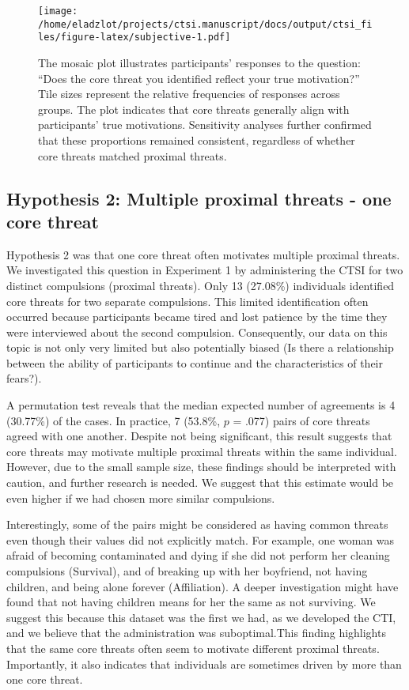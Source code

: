 \documentclass[
  man,floatsintext]{apa7}
\begin{document}
\begin{figure}
\centering
\texttt{[image: /home/eladzlot/projects/ctsi.manuscript/docs/output/ctsi\_files/figure-latex/subjective-1.pdf]}
\caption{\label{fig:subjective}The mosaic plot illustrates participants' responses to the question: ``Does the core threat you identified reflect your true motivation?'' Tile sizes represent the relative frequencies of responses across groups. The plot indicates that core threats generally align with participants' true motivations. Sensitivity analyses further confirmed that these proportions remained consistent, regardless of whether core threats matched proximal threats.}
\end{figure}

\subsection{Hypothesis 2: Multiple proximal threats - one core threat}\label{hypothesis-2-multiple-proximal-threats---one-core-threat}

Hypothesis 2 was that one core threat often motivates multiple proximal threats.
We investigated this question in Experiment 1 by administering the CTSI for two distinct compulsions (proximal threats).
Only 13 (27.08\%) individuals identified core threats for two separate compulsions.
This limited identification often occurred because participants became tired and lost patience by the time they were interviewed about the second compulsion.
Consequently, our data on this topic is not only very limited but also potentially biased (Is there a relationship between the ability of participants to continue and the characteristics of their fears?).

A permutation test reveals that the median expected number of agreements is 4 (30.77\%) of the cases.
In practice, 7 (53.8\%, \(p\) = .077) pairs of core threats agreed with one another.
Despite not being significant, this result suggests that core threats may motivate multiple proximal threats within the same individual.
However, due to the small sample size, these findings should be interpreted with caution, and further research is needed.
We suggest that this estimate would be even higher if we had chosen more similar compulsions.

Interestingly, some of the pairs might be considered as having common threats even though their values did not explicitly match.
For example, one woman was afraid of becoming contaminated and dying if she did not perform her cleaning compulsions (Survival), and of breaking up with her boyfriend, not having children, and being alone forever (Affiliation).
A deeper investigation might have found that not having children means for her the same as not surviving.
We suggest this because this dataset was the first we had, as we developed the CTI, and we believe that the administration was suboptimal.This finding highlights that the same core threats often seem to motivate different proximal threats.
Importantly, it also indicates that individuals are sometimes driven by more than one core threat.
\end{document}
